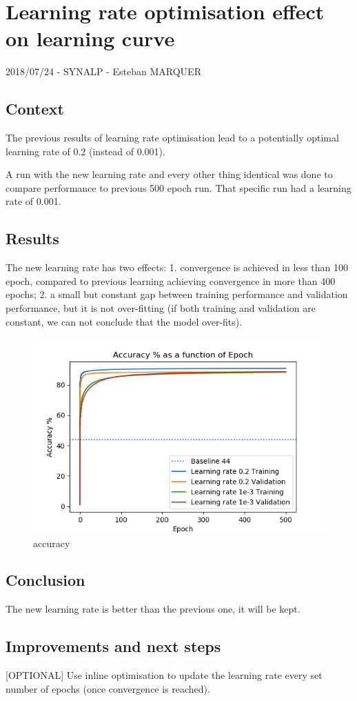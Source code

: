 \section*{Learning rate optimisation effect on learning
curve}

2018/07/24 - SYNALP - Esteban MARQUER

\subsection{Context}

The previous results of learning rate optimisation lead to a potentially
optimal learning rate of 0.2 (instead of 0.001).

A run with the new learning rate and every other thing identical was
done to compare performance to previous 500 epoch run. That specific run
had a learning rate of 0.001.

\subsection{Results}

The new learning rate has two effects: 1. convergence is achieved in
less than 100 epoch, compared to previous learning achieving convergence
in more than 400 epochs; 2. a small but constant gap between training
performance and validation performance, but it is not over-fitting (if
both training and validation are constant, we can not conclude that the
model over-fits).

\begin{figure}[ht]
\centering
\includegraphics{parts/appendix/reports-papud/2018_07_24-Learning_rate_optimisation_effect/accuracy.png}
\caption{accuracy}
\end{figure}

\subsection{Conclusion}

The new learning rate is better than the previous one, it will be kept.

\subsection{Improvements and next
steps}

{[}OPTIONAL{]} Use inline optimisation to update the learning rate every
set number of epochs (once convergence is reached).
